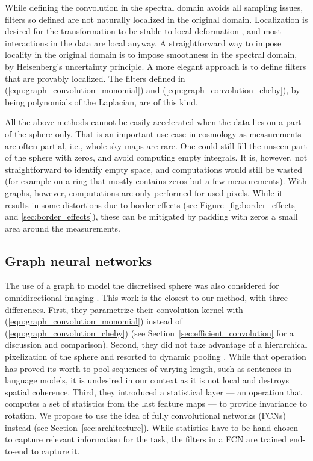 \documentclass[final,twocolumn,3p,times,sort&compress]{elsarticle}
\newcommand{\figref}[1]{Figure~\ref{fig:#1}}
\newcommand{\secref}[1]{Section~\ref{sec:#1}}
\newcommand{\eqnref}[1]{(\ref{eqn:#1})}
\newcommand{\1}{\b{1}}              %
\newcommand{\0}{\b{0}}              %
\begin{document}
While defining the convolution in the spectral domain avoids all sampling issues, filters so defined are not naturally localized in the original domain.
Localization is desired for the transformation to be stable to local deformation \citep{mallat2012scattering}, and most interactions in the data are local anyway.
A straightforward way to impose locality in the original domain is to impose smoothness in the spectral domain, by Heisenberg's uncertainty principle.
A more elegant approach is to define filters that are provably localized.
The filters defined in \eqnref{graph_convolution_monomial} and \eqnref{graph_convolution_cheby}, by being polynomials of the Laplacian, are of this kind.

All the above methods cannot be easily accelerated when the data lies on a part of the sphere only.
That is an important use case in cosmology as measurements are often partial, i.e., whole sky maps are rare.
One could still fill the unseen part of the sphere with zeros, and avoid computing empty integrals.
It is, however, not straightforward to identify empty space, and computations would still be wasted (for example on a ring that mostly contains zeros but a few measurements).
With graphs, however, computations are only performed for used pixels.
While it results in some distortions due to border effects (see \figref{border_effects} and \ref{sec:border_effects}), these can be mitigated by padding with zeros a small area around the measurements.

\subsection{Graph neural networks}

The use of a graph to model the discretised sphere was also considered for omnidirectional imaging \citep{khasanova2017graphomni}.
This work is the closest to our method, with three differences. First, they parametrize their convolution kernel with \eqnref{graph_convolution_monomial} instead of \eqnref{graph_convolution_cheby} (see \secref{efficient_convolution} for a discussion and comparison).
Second, they did not take advantage of a hierarchical pixelization of the sphere and resorted to dynamic pooling \citep{kalchbrenner2014dcnn}.
While that operation has proved its worth to pool sequences of varying length, such as sentences in language models, it is undesired in our context as it is not local and destroys spatial coherence.
Third, they introduced a statistical layer --- an operation that computes a set of statistics from the last feature maps --- to provide invariance to rotation.
We propose to use the idea of fully convolutional networks (FCNs) instead (see \secref{architecture}).
While statistics have to be hand-chosen to capture relevant information for the task, the filters in a FCN are trained end-to-end to capture it.
\end{document}
